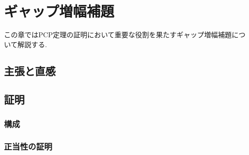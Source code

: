 \chapter{ギャップ増幅補題} \label{chap:gap-amplification}
この章ではPCP定理の証明において重要な役割を果たすギャップ増幅補題について解説する.
\section{主張と直感}
\section{証明}
\subsection{構成}
\subsection{正当性の証明}